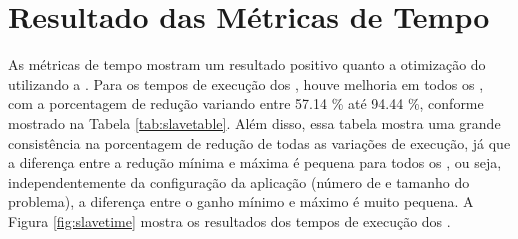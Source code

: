 \section{Resultado das Métricas de Tempo}
\label{sec:metricastempo}

As métricas de tempo mostram um resultado positivo quanto a otimização do \capb utilizando a \API \ASYNC. Para os tempos de execução dos \slaves, houve melhoria em todos os , com a porcentagem de redução variando entre 57.14 \% até 94.44 \%, conforme mostrado na Tabela \ref{tab:slavetable}. Além disso, essa tabela mostra uma grande consistência na porcentagem de redução de todas as variações de execução, já que a diferença entre a redução mínima e máxima é pequena para todos os , ou seja, independentemente da configuração da aplicação (número de \clusters e tamanho do problema), a diferença entre o ganho mínimo e máximo é muito pequena. A Figura \ref{fig:slavetime} mostra os resultados dos tempos de execução dos \slaves.

\begin{table}[h]
\centering
\caption{Reduções ao comparar-se os tempos dos processos \slaves.}
\label{tab:slavetable}
\end{table}

